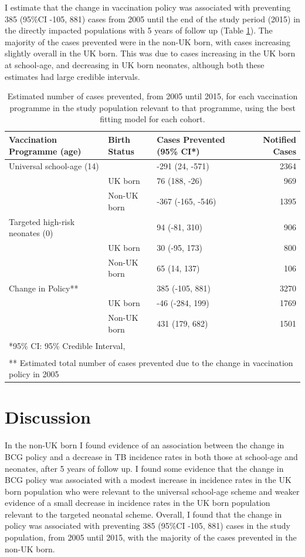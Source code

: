 \documentclass[11pt,twoside]{bristolthesis}
\begin{document}
  I estimate that the change in vaccination policy was associated with preventing 385 (95\%CI -105, 881) cases from 2005 until the end of the study period (2015) in the directly impacted populations with 5 years of follow up (Table \ref{tab:07-tab-impact}). The majority of the cases prevented were in the non-UK born, with cases increasing slightly overall in the UK born. This was due to cases increasing in the UK born at school-age, and decreasing in UK born neonates, although both these estimates had large credible intervals.
  \begin{table}[!h]
  
  \caption{\label{tab:07-tab-impact}Estimated number of cases prevented, from 2005 until 2015, for each vaccination programme in the study population relevant to that programme, using the best fitting model for each cohort.}
  \centering
  \begin{tabular}{lllr}
  \toprule
  Vaccination Programme (age) & Birth Status & Cases Prevented (95\% CI*) & Notified Cases\\
  \midrule
  Universal school-age (14) &  & -291 (24, -571) & 2364\\
   & UK born & 76 (188, -26) & 969\\
   & Non-UK born & -367 (-165, -546) & 1395\\
  Targeted high-risk neonates (0) &  & 94 (-81, 310) & 906\\
   & UK born & 30 (-95, 173) & 800\\
  \addlinespace
   & Non-UK born & 65 (14, 137) & 106\\
  Change in Policy** &  & 385 (-105, 881) & 3270\\
   & UK born & -46 (-284, 199) & 1769\\
   & Non-UK born & 431 (179, 682) & 1501\\
  \bottomrule
  \multicolumn{4}{l}{\textsuperscript{} *95\% CI: 95\% Credible Interval,}\\
  \multicolumn{4}{l}{\textsuperscript{} ** Estimated total number of cases prevented due to the change in vaccination policy in 2005}\\
  \end{tabular}
  \end{table}
  \hypertarget{discussion-4}{%
  \section{Discussion}\label{discussion-4}}
  
  In the non-UK born I found evidence of an association between the change in BCG policy and a decrease in TB incidence rates in both those at school-age and neonates, after 5 years of follow up. I found some evidence that the change in BCG policy was associated with a modest increase in incidence rates in the UK born population who were relevant to the universal school-age scheme and weaker evidence of a small decrease in incidence rates in the UK born population relevant to the targeted neonatal scheme. Overall, I found that the change in policy was associated with preventing 385 (95\%CI -105, 881) cases in the study population, from 2005 until 2015, with the majority of the cases prevented in the non-UK born.
  
\end{document}
